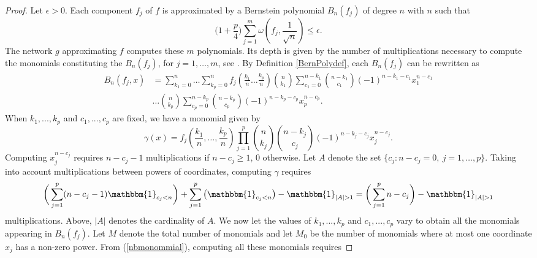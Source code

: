 \documentclass[anon,12pt]{colt2021} %
\begin{document}
\begin{proof}
Let $\epsilon > 0$. Each component $f_{j}$ of $f$ is approximated by a Bernstein polynomial $B_{n}(f_{j})$ of degree $n$ with $n$ such that
\begin{equation} \label{choicenpoly}
    \bigg(1 + \frac{p}{4} \bigg) \sum_{j=1}^{m} \omega(f_{j}, \frac{1}{\sqrt{n}}) \leq \epsilon.
\end{equation}
The network $g$ approximating $f$ computes these $m$ polynomials. Its depth is given by the number of multiplications necessary to compute the monomials constituting the $B_{n}(f_{j})$, for $j=1, \dots, m$, see \cite{kidger2019universal}. By Definition \ref{BernPolydef}, each $B_{n}(f_{j})$ can be rewritten as
\begin{align*}
    B_{n}(f_{j}, x) &= \sum_{k_{1}=0}^{n} \dots \sum_{k_{p} = 0}^{n} f_{j} \left( \frac{k_{1}}{n} \dots \frac{k_{p}}{n} \right) 
    \binom{n}{{k_{1}}}
    \sum_{c_{1}=0}^{n-k_{1}} 
    \binom{n-k_{1}}{c_{1}}
    (-1)^{n-k_{1}-c_{1}} x_{1}^{n-c_{1}} \\
    & \dots 
    \binom{n}{{k_{p}}}
    \sum_{c_{p}=0}^{n-k_{p}} 
    \binom{n-k_{p}}{c_p}
    (-1)^{n-k_{p}-c_{p}} x_{p}^{n-c_{p}} .
\end{align*}
When $k_{1},...,k_{p}$ and $c_{1},...,c_{p}$ are fixed, we have a monomial given by
\begin{equation*}
    \gamma (x) = f_{j} \left( \frac{k_{1}}{n}, \dots, \frac{k_{p}}{n} \right) \prod_{j=1}^{p} 
    \binom{n}{k_{j}}
    \binom{n-k_{j}}{c_j}
    (-1)^{n-k_{j}-c_{j}} x_{j}^{n-c_{j}}. 
\end{equation*}
Computing $x_{j}^{n-c_{j}}$ requires $n-c_{j}-1$ multiplications if $n-c_{j} \geq 1$, $0$ otherwise. Let $A$ denote the set $\lbrace c_{j}: n-c_{j} = 0, \ j=1, \dots, p \rbrace$. Taking into account multiplications between powers of coordinates, computing $\gamma$ requires
\begin{equation} \label{nbmonommial}
    \bigg( \sum_{j=1}^{p}(n-c_{j}-1) \mathbbm{1}_{c_{j} < n} \bigg) +  \sum_{j=1}^{p} \big( \mathbbm{1}_{c_{j} < n} \big) - \mathbbm{1}_{\vert A \vert > 1}  = \bigg( \sum_{j=1}^{p} n-c_{j} \bigg) - \mathbbm{1}_{\vert A \vert > 1}
\end{equation}
multiplications. Above, $\vert A \vert$ denotes the cardinality of $A$. We now let the values of $k_{1},...,k_{p}$ and $c_{1},...,c_{p}$ vary to obtain all the monomials appearing in $B_{n}(f_{j})$. Let $M$ denote the total number of monomials and let $M_{0}$ be the number of monomials where at most one coordinate $x_{j}$ has a non-zero power. From (\ref{nbmonommial}), computing all these monomials requires

\end{proof}
\end{document}
